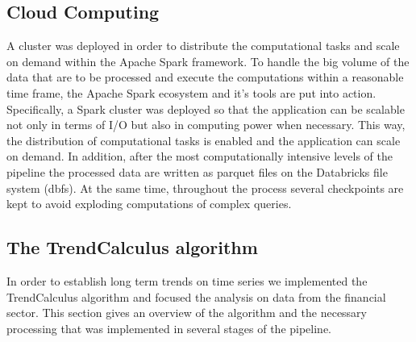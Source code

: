 \documentclass[a4, 11pt]{article}
\begin{document}
\subsection{Cloud Computing}
A cluster was deployed in order to distribute the computational tasks and scale on demand within the Apache Spark framework. To handle the big volume of the data that are to be processed and execute the computations within a reasonable time frame, the Apache Spark ecosystem and it's tools are put into action. Specifically, a Spark cluster was deployed so that the application can be scalable not only in terms of I/O but also in computing power when necessary. This way, the distribution of computational tasks is enabled and the application can scale on demand.  In addition, after the most computationally intensive levels of the pipeline the processed data are written as parquet files on the Databricks file system (dbfs). At the same time, throughout the process several checkpoints are kept to avoid exploding computations of complex queries.


\subsection{The TrendCalculus algorithm}
In order to establish long term trends on time series we implemented the TrendCalculus algorithm and focused the analysis on data from the financial sector. This section gives an overview of the algorithm and the necessary processing that was implemented in several stages of the pipeline. 
\end{document}
